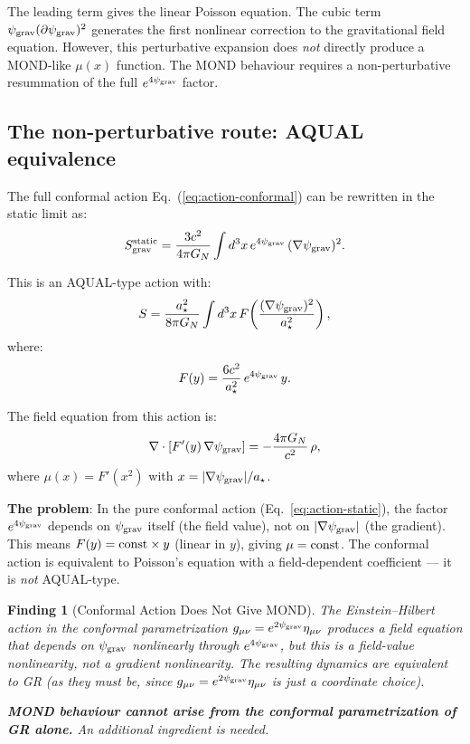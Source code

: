 \documentclass[11pt]{article}
\newtheorem{finding}{Finding}
\newcommand{\psigrav}{\psi_{\rm grav}}
\newcommand{\GN}{G_N}
\newcommand{\mufd}{\mu}
\begin{document}
The leading term gives the linear Poisson equation. The cubic term
$\psigrav(\partial\psigrav)^2$ generates the first nonlinear correction
to the gravitational field equation. However, this perturbative
expansion does \emph{not} directly produce a MOND-like $\mufd(x)$
function. The MOND behaviour requires a non-perturbative resummation
of the full $e^{4\psigrav}$ factor.

\subsection{The non-perturbative route: AQUAL equivalence}

The full conformal action Eq.~(\ref{eq:action-conformal}) can be
rewritten in the static limit as:
\begin{equation}
S_{\rm grav}^{\rm static}
= \frac{3c^2}{4\pi\GN}\int d^3x\,e^{4\psigrav}\,(\nabla\psigrav)^2.
\label{eq:action-static}
\end{equation}

This is an AQUAL-type action with:
\begin{equation}
S = \frac{a_\star^2}{8\pi\GN}\int d^3x\,F\!\left(\frac{(\nabla\psigrav)^2}
{a_\star^2}\right),
\label{eq:AQUAL-action}
\end{equation}
where:
\begin{equation}
F(y) = \frac{6c^2}{a_\star^2}\,e^{4\psigrav}\,y.
\label{eq:F-conformal}
\end{equation}

The field equation from this action is:
\begin{equation}
\nabla\cdot\left[F'(y)\,\nabla\psigrav\right]
= -\frac{4\pi\GN}{c^2}\,\rho,
\label{eq:AQUAL-field-eq}
\end{equation}
where $\mufd(x) = F'(x^2)$ with $x = |\nabla\psigrav|/a_\star$.

\textbf{The problem}: In the pure conformal action
(Eq.~\ref{eq:action-static}), the factor $e^{4\psigrav}$ depends on
$\psigrav$ itself (the field value), not on $|\nabla\psigrav|$ (the
gradient). This means $F(y) = {\rm const}\times y$ (linear in $y$),
giving $\mufd = {\rm const}$. The conformal action is equivalent to
Poisson's equation with a field-dependent coefficient --- it is
\emph{not} AQUAL-type.

\begin{finding}[Conformal Action Does Not Give MOND]
\label{find:conformal-no-MOND}
The Einstein--Hilbert action in the conformal parametrization
$g_{\mu\nu} = e^{2\psigrav}\eta_{\mu\nu}$ produces a field equation
that depends on $\psigrav$ nonlinearly through $e^{4\psigrav}$, but
this is a field-value nonlinearity, not a gradient nonlinearity. The
resulting dynamics are equivalent to GR (as they must be, since
$g_{\mu\nu} = e^{2\psigrav}\eta_{\mu\nu}$ is just a coordinate choice).

\textbf{MOND behaviour cannot arise from the conformal parametrization
of GR alone.} An additional ingredient is needed.
\end{finding}
\end{document}
